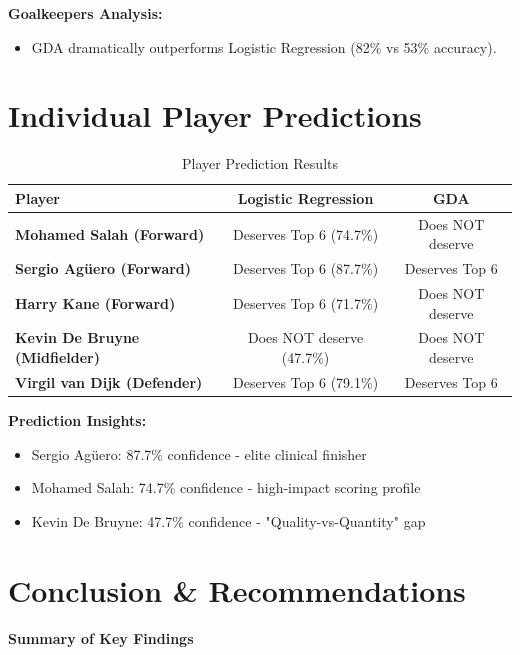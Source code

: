 \documentclass[12pt,a4paper]{article}
\begin{document}
\begin{insightbox}
\textbf{Goalkeepers Analysis:}
\begin{itemize}
    \item GDA dramatically outperforms Logistic Regression (82\% vs 53\% accuracy).
\end{itemize}
\end{insightbox}

\newpage
\section{Individual Player Predictions}

\begin{table}[H]
\centering
\caption{Player Prediction Results}
\begin{tabular}{@{}>{\bfseries}lcc@{}}
\toprule
\textbf{Player} & \textbf{Logistic Regression} & \textbf{GDA} \\
\midrule
Mohamed Salah (Forward) & Deserves Top 6 (74.7\%) & Does NOT deserve \\
Sergio Agüero (Forward) & Deserves Top 6 (87.7\%) & Deserves Top 6 \\
Harry Kane (Forward) & Deserves Top 6 (71.7\%) & Does NOT deserve \\
Kevin De Bruyne (Midfielder) & Does NOT deserve (47.7\%) & Does NOT deserve \\
Virgil van Dijk (Defender) & Deserves Top 6 (79.1\%) & Deserves Top 6 \\
\bottomrule
\end{tabular}
\end{table}

\begin{insightbox}
\textbf{Prediction Insights:}
\begin{itemize}
    \item Sergio Agüero: 87.7\% confidence - elite clinical finisher
    \item Mohamed Salah: 74.7\% confidence - high-impact scoring profile
    \item Kevin De Bruyne: 47.7\% confidence - "Quality-vs-Quantity" gap
\end{itemize}
\end{insightbox}
\newpage
\section{Conclusion \& Recommendations}

\begin{tcolorbox}[colback=lightgray, colframe=primary, arc=5pt, boxrule=1.5pt]
\centering
\textcolor{primary}{\textbf{\Large Summary of Key Findings}}
\end{tcolorbox}
\end{document}
